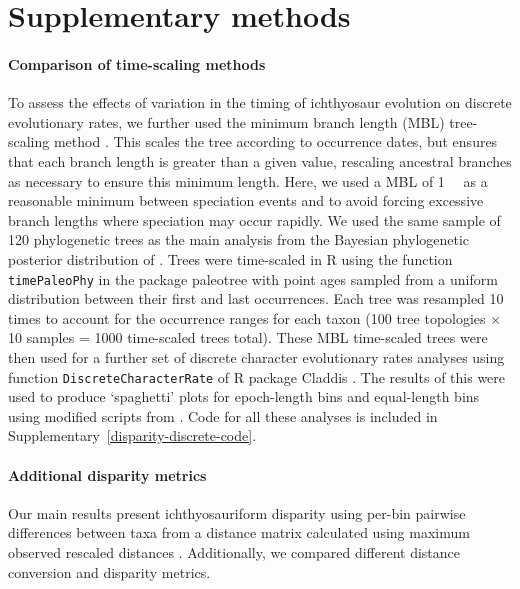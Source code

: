 \documentclass[british,a4paper]{article}
\begin{document}
\section{Supplementary methods}\label{supplemental-methods}

\paragraph{Comparison of time-scaling methods}\label{comparison-of-time-scaling-methods}

To assess the effects of variation in the timing of ichthyosaur evolution on
discrete evolutionary rates, we further used the minimum branch length (MBL)
tree-scaling method \autocite{Bapst2012MEE, Laurin2004SB}. This scales the
tree according to occurrence dates, but ensures that each branch length is
greater than a given value, rescaling ancestral branches as necessary to ensure
this minimum length. Here, we used a MBL of \SI{1}{\mega\annum} as a reasonable
minimum between speciation events and to avoid forcing excessive branch lengths
where speciation may occur rapidly. We used the same sample of 120 phylogenetic
trees as the main analysis from the Bayesian phylogenetic posterior distribution
of \textcite{Moon2018JSP}. Trees were time-scaled in R \autocite{RCoreTeam2019} using the
function \texttt{timePaleoPhy} in the package paleotree \autocite{Bapst2012MEE}
with point ages sampled from a uniform distribution between their first and last
occurrences. Each tree was resampled 10 times to account for the occurrence
ranges for each taxon (100 tree topologies × 10 samples = 1000 time-scaled trees
total). These MBL time-scaled trees were then used for a further set of discrete
character evolutionary rates analyses using function
\texttt{DiscreteCharacterRate} of R package Claddis \autocite{Lloyd2016BJLS}. The
results of this were used to produce `spaghetti' plots for epoch-length bins and
equal-length bins using modified scripts from \textcite{Close2015CB}. Code for
all these analyses is included in Supplementary~\cref{disparity-discrete-code}.

\paragraph{Additional disparity metrics}

Our main results present ichthyosauriform disparity using per-bin pairwise
differences between taxa from a distance matrix calculated using maximum
observed rescaled distances \autocite{Lloyd2016BJLS}. Additionally, we compared
different distance conversion and disparity metrics.
\end{document}
